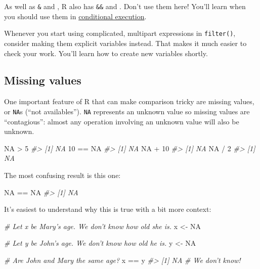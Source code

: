 \documentclass[]{book}
\newenvironment{Shaded}{\begin{snugshade}}{\end{snugshade}}
\newcommand{\DecValTok}[1]{\textcolor[rgb]{0.00,0.00,0.81}{{#1}}}
\newcommand{\StringTok}[1]{\textcolor[rgb]{0.31,0.60,0.02}{{#1}}}
\newcommand{\CommentTok}[1]{\textcolor[rgb]{0.56,0.35,0.01}{\textit{{#1}}}}
\newcommand{\OtherTok}[1]{\textcolor[rgb]{0.56,0.35,0.01}{{#1}}}
\newcommand{\NormalTok}[1]{{#1}}
\begin{document}
As well as \texttt{\&} and \texttt{\textbar{}}, R also has \texttt{\&\&}
and \texttt{\textbar{}\textbar{}}. Don't use them here! You'll learn
when you should use them in
\protect\hyperlink{conditional-execution}{conditional execution}.

Whenever you start using complicated, multipart expressions in
\texttt{filter()}, consider making them explicit variables instead. That
makes it much easier to check your work. You'll learn how to create new
variables shortly.

\subsection{Missing values}\label{missing-values}

One important feature of R that can make comparison tricky are missing
values, or \texttt{NA}s (``not availables''). \texttt{NA} represents an
unknown value so missing values are ``contagious'': almost any operation
involving an unknown value will also be unknown.

\begin{Shaded}
\begin{Highlighting}[]
\OtherTok{NA} \NormalTok{>}\StringTok{ }\DecValTok{5}
\CommentTok{#> [1] NA}
\DecValTok{10} \NormalTok{==}\StringTok{ }\OtherTok{NA}
\CommentTok{#> [1] NA}
\OtherTok{NA} \NormalTok{+}\StringTok{ }\DecValTok{10}
\CommentTok{#> [1] NA}
\OtherTok{NA} \NormalTok{/}\StringTok{ }\DecValTok{2}
\CommentTok{#> [1] NA}
\end{Highlighting}
\end{Shaded}

The most confusing result is this one:

\begin{Shaded}
\begin{Highlighting}[]
\OtherTok{NA} \NormalTok{==}\StringTok{ }\OtherTok{NA}
\CommentTok{#> [1] NA}
\end{Highlighting}
\end{Shaded}

It's easiest to understand why this is true with a bit more context:

\begin{Shaded}
\begin{Highlighting}[]
\CommentTok{# Let x be Mary's age. We don't know how old she is.}
\NormalTok{x <-}\StringTok{ }\OtherTok{NA}

\CommentTok{# Let y be John's age. We don't know how old he is.}
\NormalTok{y <-}\StringTok{ }\OtherTok{NA}

\CommentTok{# Are John and Mary the same age?}
\NormalTok{x ==}\StringTok{ }\NormalTok{y}
\CommentTok{#> [1] NA}
\CommentTok{# We don't know!}
\end{Highlighting}
\end{Shaded}
\end{document}
